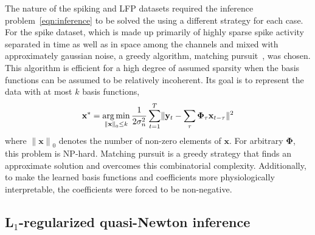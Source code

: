 \documentclass[10pt]{article}
\newcommand{\card}[1]{{\lVert#1\rVert}_0}
\newcommand{\mb}{\mathbf}
\newcommand{\norm}[1]{\lVert#1\rVert}
\newcommand\argmin{\operatornamewithlimits{arg\,min}}
\begin{document}
The nature of the spiking and LFP datasets required the inference
problem~\ref{eqn:inference} to be solved the using a different
strategy for each case. For the spike dataset, which is made up
primarily of highly sparse spike activity separated in time as well as
in space among the channels and mixed with approximately gaussian
noise, a greedy algorithm, matching
pursuit~\cite{mallat1993matching,olshausen2003learning,Smith:2006qf},
was chosen. This algorithm is efficient for a high degree of assumed
sparsity when the basis functions can be assumed to be relatively
incoherent. Its goal is to represent the data with at most $k$ basis
functions,
\begin{align*}
  \mb{x}^* = \argmin_{\card{\mb{x}} \le k} \frac{1}{2 \sigma_n^2}
  \sum_{t=1}^T \norm{\mb{y}_t - \sum_\tau \mb{\Phi}_\tau
    \mb{x}_{t-\tau}}^2
\end{align*}
where $\card{\mb{x}}$ denotes the number of non-zero elements of
$\mb{x}$. For arbitrary $\mb{\Phi}$, this problem is
NP-hard\cite{davis1997adaptive}. Matching pursuit is a greedy strategy
that finds an approximate solution and overcomes this combinatorial
complexity. Additionally, to make the learned basis functions and
coefficients more physiologically interpretable, the coefficients were
forced to be non-negative.

\subsection{L$_1$-regularized quasi-Newton inference}
\label{sec:quasinewton}
\end{document}
